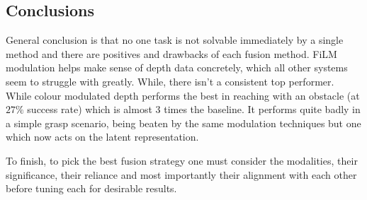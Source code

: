 \subsection{Conclusions}
General conclusion is that no one task is not solvable immediately by a single method and there are positives and drawbacks of each fusion method. FiLM modulation helps make sense of depth data concretely, which all other systems seem to struggle with greatly. While, there isn't a consistent top performer. While colour modulated depth performs the best in reaching with an obstacle (at $27\%$ success rate) which is almost 3 times the baseline. It performs quite badly in a simple grasp scenario, being beaten by the same modulation techniques but one which now acts on the latent representation.

To finish, to pick the best fusion strategy one must consider the modalities, their significance, their reliance and most importantly their alignment with each other before tuning each for desirable results.


